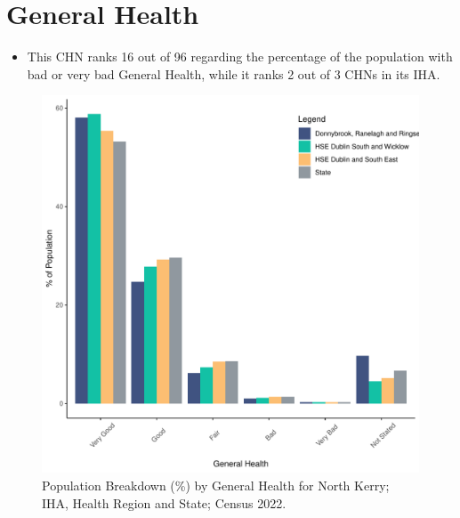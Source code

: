 \documentclass{article}
\begin{document}
\pagebreak

\section{General Health}\label{sect:GenHealth}
\begin{itemize}
\item  This CHN ranks  16 out of 96 regarding the percentage of the population with bad or very bad General Health, while it ranks   2 out of 3 CHNs in its IHA.
\end{itemize}
\begin{figure}[h]
	\centering
	\includegraphics[width = 150mm]{../figures/GenED.pdf}
	\caption{Population Breakdown (\%) by General Health for North Kerry; IHA, Health Region and State;  Census 2022.}
	\label{fig:2ae19629-1a6a-13a3-e055-000000000001}
	\end{figure}
\end{document}
